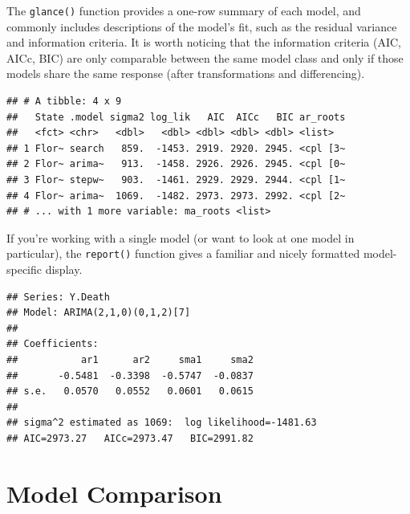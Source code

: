 \documentclass[]{book}
\newenvironment{Shaded}{\begin{snugshade}}{\end{snugshade}}
\newcommand{\KeywordTok}[1]{\textcolor[rgb]{0.13,0.29,0.53}{\textbf{#1}}}
\newcommand{\StringTok}[1]{\textcolor[rgb]{0.31,0.60,0.02}{#1}}
\newcommand{\OperatorTok}[1]{\textcolor[rgb]{0.81,0.36,0.00}{\textbf{#1}}}
\newcommand{\NormalTok}[1]{#1}
\begin{document}
The \texttt{glance()} function provides a one-row summary of each model,
and commonly includes descriptions of the model's fit, such as the
residual variance and information criteria. It is worth noticing that
the information criteria (AIC, AICc, BIC) are only comparable between
the same model class and only if those models share the same response
(after transformations and differencing).

\begin{Shaded}
\end{Shaded}

\begin{verbatim}
## # A tibble: 4 x 9
##   State .model sigma2 log_lik   AIC  AICc   BIC ar_roots
##   <fct> <chr>   <dbl>   <dbl> <dbl> <dbl> <dbl> <list>  
## 1 Flor~ search   859.  -1453. 2919. 2920. 2945. <cpl [3~
## 2 Flor~ arima~   913.  -1458. 2926. 2926. 2945. <cpl [0~
## 3 Flor~ stepw~   903.  -1461. 2929. 2929. 2944. <cpl [1~
## 4 Flor~ arima~  1069.  -1482. 2973. 2973. 2992. <cpl [2~
## # ... with 1 more variable: ma_roots <list>
\end{verbatim}

If you're working with a single model (or want to look at one model in
particular), the \texttt{report()} function gives a familiar and nicely
formatted model-specific display.

\begin{Shaded}
\end{Shaded}

\begin{verbatim}
## Series: Y.Death 
## Model: ARIMA(2,1,0)(0,1,2)[7] 
## 
## Coefficients:
##           ar1      ar2     sma1     sma2
##       -0.5481  -0.3398  -0.5747  -0.0837
## s.e.   0.0570   0.0552   0.0601   0.0615
## 
## sigma^2 estimated as 1069:  log likelihood=-1481.63
## AIC=2973.27   AICc=2973.47   BIC=2991.82
\end{verbatim}

\section{Model Comparison}\label{model-comparison}
\end{document}
